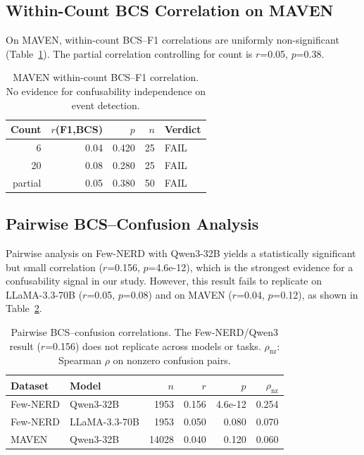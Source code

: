 \documentclass[11pt,a4paper]{article}
\begin{document}
\subsection{Within-Count BCS Correlation on MAVEN}

On MAVEN, within-count BCS--F1 correlations are uniformly non-significant (Table~\ref{tab:maven_bcs}).
The partial correlation controlling for count is $r$=0.05, $p$=0.38.

\begin{table}[h]
\centering
\small
\begin{tabular}{rrrrl}
\toprule
Count & $r$(F1,BCS) & $p$ & $n$ & Verdict \\
\midrule
6   & 0.04 & 0.420 & 25 & FAIL \\
20  & 0.08 & 0.280 & 25 & FAIL \\
partial & 0.05 & 0.380 & 50 & FAIL \\
\bottomrule
\end{tabular}
\caption{MAVEN within-count BCS--F1 correlation. No evidence for confusability independence on event detection.}
\label{tab:maven_bcs}
\end{table}

\subsection{Pairwise BCS--Confusion Analysis}

Pairwise analysis on Few-NERD with Qwen3-32B yields a statistically significant but small correlation ($r$=0.156, $p$=4.6e-12), which is the strongest evidence for a confusability signal in our study.
However, this result fails to replicate on LLaMA-3.3-70B ($r$=0.05, $p$=0.08) and on MAVEN ($r$=0.04, $p$=0.12), as shown in Table~\ref{tab:pairwise}.

\begin{table}[h]
\centering
\small
\begin{tabular}{llrrrr}
\toprule
Dataset & Model & $n$ & $r$ & $p$ & $\rho_{\text{nz}}$ \\
\midrule
Few-NERD & Qwen3-32B     & 1953  & 0.156 & 4.6e-12 & 0.254 \\
Few-NERD & LLaMA-3.3-70B & 1953  & 0.050 & 0.080   & 0.070 \\
MAVEN    & Qwen3-32B     & 14028 & 0.040 & 0.120   & 0.060 \\
\bottomrule
\end{tabular}
\caption{Pairwise BCS--confusion correlations. The Few-NERD/Qwen3 result ($r$=0.156) does not replicate across models or tasks. $\rho_{\text{nz}}$: Spearman $\rho$ on nonzero confusion pairs.}
\label{tab:pairwise}
\end{table}
\end{document}
